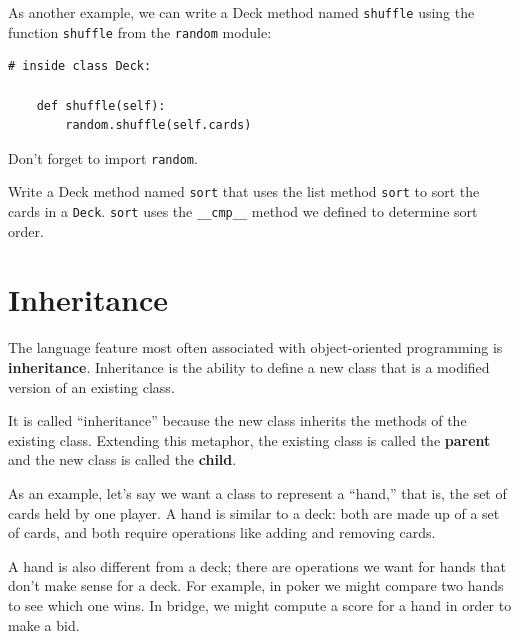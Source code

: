 \documentclass[10pt]{book}
\begin{document}
As another example, we can write a Deck method named {\tt shuffle}
using the function {\tt shuffle} from the {\tt random} module:


\beforeverb
\begin{verbatim}
# inside class Deck:
            
    def shuffle(self):
        random.shuffle(self.cards)
\end{verbatim}
\afterverb
%
Don't forget to import {\tt random}.

\begin{ex}

Write a Deck method named {\tt sort} that uses the list method
{\tt sort} to sort the cards in a {\tt Deck}.  {\tt sort} uses
the \verb"__cmp__" method we defined to determine sort order.
\end{ex}



\section{Inheritance}


The language feature most often associated with object-oriented
programming is {\bf inheritance}.  Inheritance is the ability to
define a new class that is a modified version of an existing
class.


It is called ``inheritance'' because the new class inherits the
methods of the existing class.  Extending this metaphor, the existing
class is called the {\bf parent} and the new class is
called the {\bf child}.

As an example, let's say we want a class to represent a ``hand,''
that is, the set of cards held by one player.  A hand is similar to a
deck: both are made up of a set of cards, and both require operations
like adding and removing cards.

A hand is also different from a deck; there are operations we want for
hands that don't make sense for a deck.  For example, in poker we
might compare two hands to see which one wins.  In bridge, we might
compute a score for a hand in order to make a bid.
\end{document}
